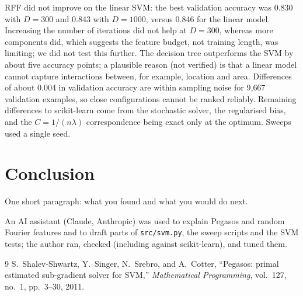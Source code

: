 \documentclass[10pt,twocolumn,a4paper]{article}
\begin{document}
RFF did not improve on the linear SVM: the best validation accuracy was 0.830
with $D=300$ and 0.843 with $D=1000$, versus 0.846 for the linear model.
Increasing the number of iterations did not help at $D=300$, whereas more
components did, which suggests the feature budget, not training length, was
limiting; we did not test this further. The decision tree outperforms the
SVM by about five accuracy points; a plausible reason (not verified) is that
a linear model cannot capture interactions between, for example, location
and area. Differences of about 0.004 in validation accuracy are within
sampling noise for 9{,}667 validation examples, so close configurations
cannot be ranked reliably. Remaining differences to scikit-learn come from
the stochastic solver, the regularised bias, and the $C=1/(n\lambda)$
correspondence being exact only at the optimum. Sweeps used a single seed.

\section{Conclusion}
One short paragraph: what you found and what you would do next.

An AI assistant (Claude, Anthropic) was used to explain Pegasos and random
Fourier features and to draft parts of \texttt{src/svm.py}, the sweep scripts
and the SVM tests; the author ran, checked (including against scikit-learn),
and tuned them.

\begin{thebibliography}{9}
S.~Shalev-Shwartz, Y.~Singer, N.~Srebro, and A.~Cotter,
``Pegasos: primal estimated sub-gradient solver for SVM,''
\emph{Mathematical Programming}, vol.~127, no.~1, pp.~3--30, 2011.
\end{thebibliography}
\end{document}
